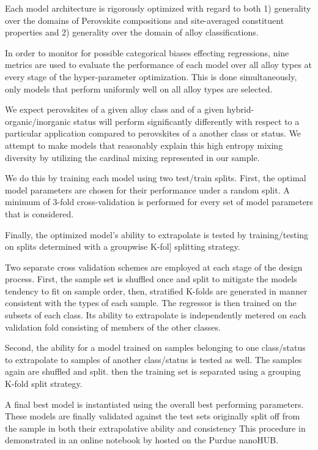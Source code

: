 Each model architecture is rigorously optimized with regard to both 1) generality over the domains of Perovskite compositions and site-averaged constituent properties and 2) generality over the domain of alloy classifications.

In order to monitor for possible categorical biases effecting regressions, nine metrics are used to evaluate the performance of each model over all alloy types at every stage of the hyper-parameter optimization.
This is done simultaneously, only models that perform uniformly well on all alloy types are selected.

We expect perovskites of a given alloy class and of a given hybrid-organic/inorganic status will perform significantly differently with respect to a particular application compared to perovskites of a another class or status.
We attempt to make models that reasonably explain this high entropy mixing diversity by utilizing the cardinal mixing represented in our sample.

We do this by training each model using two test/train splits.
First, the optimal model parameters are chosen for their performance under a random split.
A minimum of 3-fold cross-validation is performed for every set of model parameters that is considered.

Finally, the optimized model's ability to extrapolate is
tested by training/testing on splits determined with a groupwise
K-fol] splitting strategy.

Two separate cross validation schemes are employed at each stage of the design process.
First, the sample set is shuffled once and split to mitigate the models tendency to fit on sample order, then, stratified K-folds are generated in manner consistent with the types of each sample.
The regressor is then trained on the subsets of each class.
Its ability to extrapolate is independently metered on each validation fold consisting of members of the other classes.

Second, the ability for a model trained on samples belonging to one class/status to extrapolate to samples of another class/status is tested as well.
The samples again are shuffled and split.
then the training set is separated using a grouping K-fold split strategy.

A final best model is instantiated using the overall best performing parameters.
These models are finally validated against the test sets originally split off from the sample in both their extrapolative ability and consistency 
This procedure in demonstrated in an online notebook by \textcite{manganaris-2022-mrs-comput} hosted on the Purdue nanoHUB.

